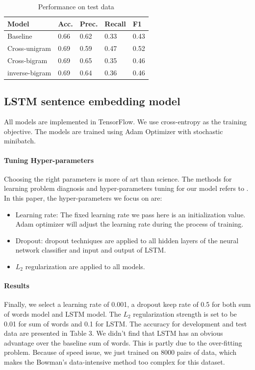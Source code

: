 \documentclass[11pt,a4paper]{article}
\begin{document}
\begin{table}[h]
\begin{center}
\begin{tabular}{|l|llll|}
\hline Model & Acc. & Prec.  & Recall & F1 \\ \hline
Baseline & 0.66 &  0.62 & 0.33 & 0.43 \\
Cross-unigram & 0.69 & 0.59 & 0.47 & 0.52 \\
Cross-bigram & 0.69 & 0.65 & 0.35 & 0.46 \\
inverse-bigram& 0.69 & 0.64 & 0.36 & 0.46\\
\hline
\end{tabular}
\end{center}
\caption{ Performance on test data}
\end{table}


\subsection{LSTM sentence embedding model}
All models are implemented in TensorFlow.  We use cross-entropy as the training objective. The models are trained using Adam Optimizer with stochastic minibatch. 
\paragraph{Tuning Hyper-parameters}  Choosing the right parameters is more of art than science. The methods for learning problem diagnosis and hyper-parameters tuning for our model refers to \cite{pompeyart}. In this paper, the hyper-parameters we focus on are:
\begin{itemize}
    \item Learning rate: The fixed learning rate we pass here is an initialization value. Adam optimizer will adjust the learning rate during the process of training.
    \item Dropout: dropout techniques are applied to all hidden layers of the neural network classifier and input and output of LSTM.
    \item $L_2$ regularization are applied to all models.
\end{itemize}

\paragraph{Results} Finally, we select a learning rate of 0.001, a dropout keep rate of 0.5  for both sum of words model and LSTM model. The $L_2$ regularization strength is set to be 0.01 for sum of words and 0.1 for LSTM. The accuracy for development and test data are presented in Table 3. We didn't find that LSTM has an obvious advantage over the baseline sum of words. This is partly due to the over-fitting problem. Because of speed issue, we just trained on 8000 pairs of data, which makes the Bowman's data-intensive method too complex for this dataset.
\end{document}
